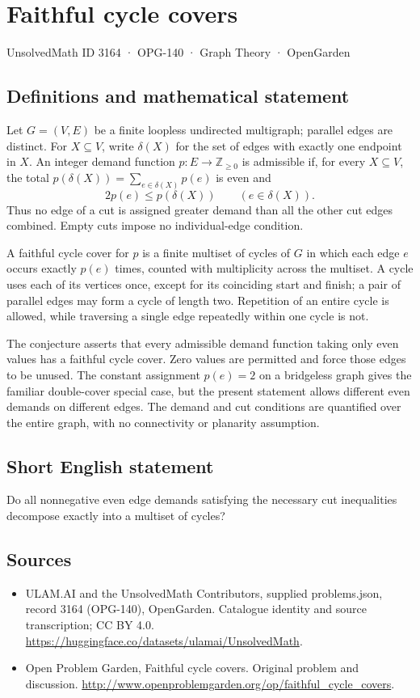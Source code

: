 \documentclass[11pt,a4paper]{article}
\begin{document}
\section*{Faithful cycle covers}\label{3164}
{\small UnsolvedMath ID 3164 · OPG-140 · Graph Theory · OpenGarden}
\subsection{Definitions and mathematical statement}
Let $G=(V,E)$ be a finite loopless undirected multigraph; parallel edges are distinct. For $X\subseteq V$, write $\delta(X)$ for the set of edges with exactly one endpoint in $X$. An integer demand function $p:E\to\mathbb Z_{\ge0}$ is admissible if, for every $X\subseteq V$, the total $p(\delta(X))=\sum_{e\in\delta(X)}p(e)$ is even and
\[
       2p(e)\le p(\delta(X))\qquad(e\in\delta(X)).
\]
Thus no edge of a cut is assigned greater demand than all the other cut edges combined. Empty cuts impose no individual-edge condition.

A faithful cycle cover for $p$ is a finite multiset of cycles of $G$ in which each edge $e$ occurs exactly $p(e)$ times, counted with multiplicity across the multiset. A cycle uses each of its vertices once, except for its coinciding start and finish; a pair of parallel edges may form a cycle of length two. Repetition of an entire cycle is allowed, while traversing a single edge repeatedly within one cycle is not.

The conjecture asserts that every admissible demand function taking only even values has a faithful cycle cover. Zero values are permitted and force those edges to be unused. The constant assignment $p(e)=2$ on a bridgeless graph gives the familiar double-cover special case, but the present statement allows different even demands on different edges. The demand and cut conditions are quantified over the entire graph, with no connectivity or planarity assumption.
\subsection{Short English statement}
Do all nonnegative even edge demands satisfying the necessary cut inequalities decompose exactly into a multiset of cycles?
\subsection{Sources}
\begin{itemize}
\item[S1] ULAM.AI and the UnsolvedMath Contributors, supplied problems.json, record 3164 (OPG-140), OpenGarden. Catalogue identity and source transcription; CC BY 4.0.
\url{https://huggingface.co/datasets/ulamai/UnsolvedMath}.
\item[S2] Open Problem Garden, Faithful cycle covers. Original problem and discussion.
\url{http://www.openproblemgarden.org/op/faithful_cycle_covers}.
\end{itemize}
\end{document}
